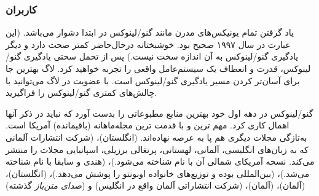 \subsubsection{کاربران}

یاد گرفتن تمام یونیکس‌های مدرن مانند گنو/لینوکس در ابتدا دشوار می‌باشد.
(این عبارت در سال ۱۹۹۷  صحیح بود. خوشبختانه درحال‌حاضر
کمتر صحت دارد و دیگر یادگیری گنو/لینوکس به آن اندازه سخت نیست.)
پس از تحمل سختی یادگیری گنو/لینوکس، قدرت و انعطاف یک سیستم‌عامل واقعی را
تجربه خواهید کرد. لاگ بهترین جا برای آسان‌تر کردن مسیر یادگیری گنو/لینوکس است.
با عضویت در لاگ می‌توانید با چالش‌های کمتری گنو/لینوکس را فراگیرید.

گنو/لینوکس در دهه اول خود بهترین منابع مطبوعاتی را بدست آورد
که نباید در ذکر آنها اهمال کاری کرد.
مهم ترین و با قدمت ترین مجله‌ماهانه (باقیمانده) آمریکا
است. به‌تازگی مجلات دیگری هم پا به عرصه نهاده‌اند.
‌(انگلستان)،
(شرکت انتشارات آلمانی که به زبان‌های انگلیسی،
آلمانی، لهستانی، پرتغالی برزیلی، اسپانیایی
مجلات را منتشر می‌کند. نسخه آمریکای شمالی آن
با نام
شناخته می‌شود.)،
(هندی و سابقا با نام
شناخته می‌شد.)،
(بین‌المللی بوده و توزیع‌های خانواده اوبونتو را پوشش می‌دهد.)،
(انگلستان)،
(آلمان)،
(آلمان)،
(شرکت انتشاراتی آلمان واقع در انگلیس)
و
({\itshape صدای متن‌باز} گذشته)

